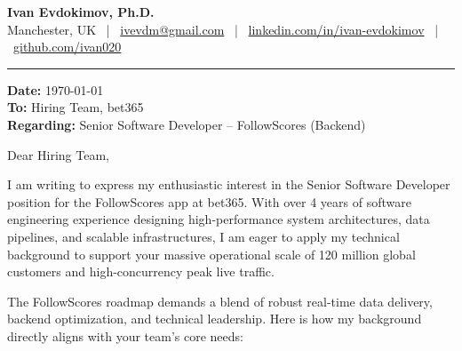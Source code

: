 \documentclass[11pt,a4paper]{article}
\begin{document}
{\centering
{\LARGE \bfseries \color{primary} Ivan Evdokimov, Ph.D.} \\
\vspace{0.2em}
\small Manchester, UK \ | \ \href{mailto:ivevdm@gmail.com}{ivevdm@gmail.com} \ | \ \href{https://linkedin.com/in/ivan-evdokimov}{linkedin.com/in/ivan-evdokimov} \ | \ \href{https://github.com/ivan020}{github.com/ivan020}
}

\vspace{1.5em}
\hrule
\vspace{1.5em}

\textbf{Date:} \today \\
\textbf{To:} Hiring Team, bet365 \\
\textbf{Regarding:} Senior Software Developer – FollowScores (Backend)

\vspace{1em}

Dear Hiring Team,

I am writing to express my enthusiastic interest in the Senior Software Developer position for the FollowScores app at bet365. With over 4 years of software engineering experience designing high-performance system architectures, data pipelines, and scalable infrastructures, I am eager to apply my technical background to support your massive operational scale of 120 million global customers and high-concurrency peak live traffic.

The FollowScores roadmap demands a blend of robust real-time data delivery, backend optimization, and technical leadership. Here is how my background directly aligns with your team's core needs:
\end{document}
